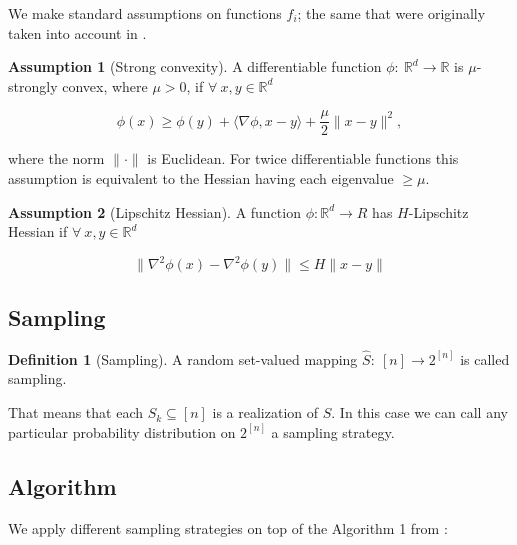 \documentclass{article}
\theoremstyle{definition}
\newtheorem{definition}{Definition}
\theoremstyle{assumption}
\newtheorem{assumption}{Assumption}
\theoremstyle{lemma}
\theoremstyle{theorem}
\theoremstyle{proposition}
\begin{document}
	We make standard assumptions on functions $f_i$; the same that were originally taken into account in \cite{kovalev2019stochastic}.
	
	
	\begin{assumption}[Strong convexity] A differentiable function $\phi:\ \mathbb R^d \rightarrow \mathbb R$ is $\mu$-strongly convex, where $\mu > 0$, if $\forall\ x, y \in \mathbb R^d$
	
	\begin{equation}\label{strong-conv}
		\phi(x) \geqslant \phi(y) + \langle \nabla \phi, x - y \rangle + \frac{\mu}{2} \| x - y \|^2,
	\end{equation}
	\end{assumption}
	where the norm $\| \cdot \|$ is Euclidean. For twice differentiable functions this assumption is equivalent to the Hessian having each eigenvalue $\geqslant \mu$.
	
	\begin{assumption}[Lipschitz Hessian] A function $\phi: \mathbb R^d \rightarrow R$ has $H$-Lipschitz Hessian if $\forall\ x, y \in \mathbb R^d$
	
	\begin{equation}\label{lip-hess}
		\| \nabla^2 \phi(x) - \nabla^2 \phi(y) \| \leqslant H \| x - y \|
	\end{equation}
	\end{assumption}

	\subsection{Sampling}
	
	\begin{definition}[Sampling]
		A random set-valued mapping $\hat S:\ [n] \rightarrow 2^{[n]}$ is called sampling.
	\end{definition}

	That means that each $S_k \subseteq [n]$ is a realization of $\hat S$. In this case we can call any particular probability distribution on $2^{[n]}$ a sampling strategy.
	\subsection{Algorithm}
	
	We apply different sampling strategies on top of the Algorithm 1 from \cite{kovalev2019stochastic}:
	
\end{document}
